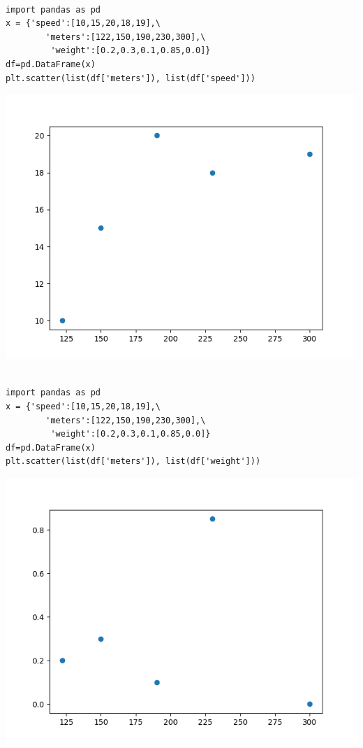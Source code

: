 \documentclass[11pt]{article}
\begin{document}
\newpage
\begin{verbatim}

import pandas as pd
x = {'speed':[10,15,20,18,19],\
        'meters':[122,150,190,230,300],\
         'weight':[0.2,0.3,0.1,0.85,0.0]}
df=pd.DataFrame(x)
plt.scatter(list(df['meters']), list(df['speed']))

\end{verbatim}

\begin{center}
\includegraphics[width=.9\linewidth]{fig6.png}
\end{center}

\newpage
\begin{verbatim}

import pandas as pd
x = {'speed':[10,15,20,18,19],\
        'meters':[122,150,190,230,300],\
         'weight':[0.2,0.3,0.1,0.85,0.0]}
df=pd.DataFrame(x)
plt.scatter(list(df['meters']), list(df['weight']))

\end{verbatim}

\begin{center}
\includegraphics[width=.9\linewidth]{fig7.png}
\end{center}
\end{document}
